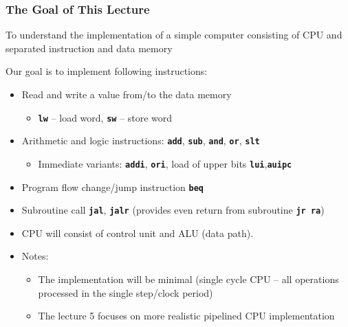 \documentclass{beamer}
\begin{document}
\begin{frame}
\frametitle{The Goal of This Lecture}

To understand the implementation of a simple computer consisting of CPU and separated instruction and data memory

Our goal is to implement following instructions:

\begin{itemize}
\item Read and write a value from/to the data memory
\begin{itemize}
\item \textbf{\texttt{lw}} -- load word, \textbf{\texttt{sw}} -- store word
\end{itemize}
\item Arithmetic and logic instructions: \textbf{\texttt{add}}, \textbf{\texttt{sub}}, \textbf{\texttt{and}}, \textbf{\texttt{or}}, \textbf{\texttt{slt}}
\begin{itemize}
\item Immediate variants: \textbf{\texttt{addi}}, \textbf{\texttt{ori}}, load of upper bits \textbf{\texttt{lui}},\textbf{\texttt{auipc}}
\end{itemize}
\item Program flow change/jump instruction \textbf{\texttt{beq}}
\item Subroutine call \textbf{\texttt{jal}}, \textbf{\texttt{jalr}} (provides even return from subroutine \textbf{\texttt{jr~ra}})
\item CPU will consist of control unit and ALU (data path).
\item Notes:
\begin{itemize}
\item The implementation will be minimal (single cycle CPU – all operations processed in the single step/clock period)
\item The lecture 5 focuses on more realistic pipelined CPU implementation
\end{itemize}
\end{itemize}

\end{frame}
\end{document}
